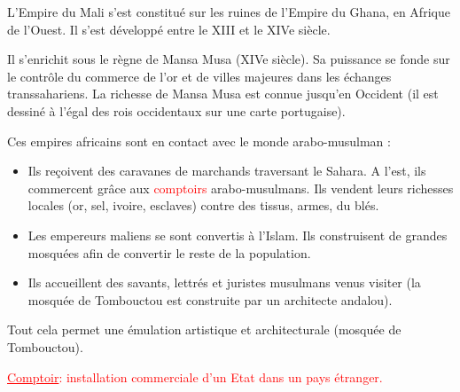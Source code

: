 \documentclass{beamer}
\begin{document}
\begin{frame}
\hspace{1cm} L'Empire du Mali s'est constitué sur les ruines de l'Empire du Ghana, en Afrique de l'Ouest. Il s'est développé entre le XIII et le XIVe siècle.
 
Il s'enrichit sous le règne de Mansa Musa (XIVe siècle). Sa puissance se fonde sur le contrôle du commerce de l'or et de villes majeures dans les échanges transsahariens. La richesse de Mansa Musa est connue jusqu'en Occident (il est dessiné à l'égal des rois occidentaux sur une carte portugaise).
\end{frame}
\begin{frame}

Ces empires africains sont en contact avec le monde arabo-musulman :  
\begin{itemize}
\item Ils reçoivent des caravanes de marchands traversant le Sahara. A l'est, ils commercent grâce aux \textcolor{red}{comptoirs} arabo-musulmans. Ils vendent leurs richesses locales (or, sel, ivoire, esclaves) contre des tissus, armes, du blés.
\item Les empereurs maliens se sont convertis à l'Islam. Ils construisent de grandes mosquées afin de convertir le reste de la population.
\item Ils accueillent des savants, lettrés et juristes musulmans venus visiter (la mosquée de Tombouctou est construite par un architecte andalou).
\end{itemize} 

Tout cela permet une émulation artistique et architecturale (mosquée de Tombouctou).

 \textcolor{red}{\underline{Comptoir}: installation commerciale d'un Etat dans un pays étranger.}

\end{frame}




    
\end{document}
